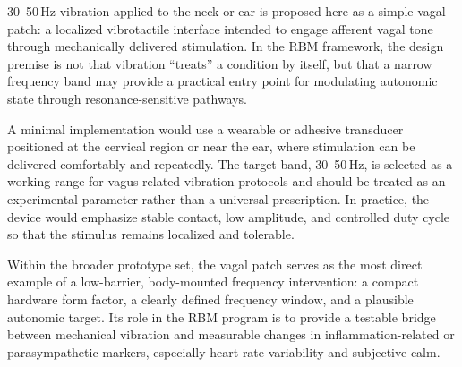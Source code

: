 30--50\,Hz vibration applied to the neck or ear is proposed here as a simple vagal patch: a localized vibrotactile interface intended to engage afferent vagal tone through mechanically delivered stimulation. In the RBM framework, the design premise is not that vibration ``treats'' a condition by itself, but that a narrow frequency band may provide a practical entry point for modulating autonomic state through resonance-sensitive pathways.

A minimal implementation would use a wearable or adhesive transducer positioned at the cervical region or near the ear, where stimulation can be delivered comfortably and repeatedly. The target band, 30--50\,Hz, is selected as a working range for vagus-related vibration protocols and should be treated as an experimental parameter rather than a universal prescription. In practice, the device would emphasize stable contact, low amplitude, and controlled duty cycle so that the stimulus remains localized and tolerable.

Within the broader prototype set, the vagal patch serves as the most direct example of a low-barrier, body-mounted frequency intervention: a compact hardware form factor, a clearly defined frequency window, and a plausible autonomic target. Its role in the RBM program is to provide a testable bridge between mechanical vibration and measurable changes in inflammation-related or parasympathetic markers, especially heart-rate variability and subjective calm.
